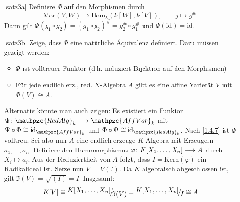 \documentclass[a4paper,12pt]{scrbook}
\makeatletter
\theoremstyle{blah}
\theoremstyle{stz}
\renewcommand{\proofname}{Beweis}
\renewenvironment{proof}[1][\proofname]{\par
  \pushQED{\qed}%
  \normalfont \topsep6\p@\@plus6\p@\relax
  \trivlist
  \item[\hskip\labelsep
        \itshape
    #1\@addpunct{:}]\ignorespaces
}{%
  \popQED\endtrivlist\@endpefalse
}
\def\I{\mathfrak{I}}
\newcommand{\AffVar}{\mathpzc{AffVar}}
\newcommand{\RedAlg}{\mathpzc{RedAlg}}
\newcommand{\Hom}{\mathrm{Hom}}
\newcommand{\Mor}{\mathrm{Mor}}
\newcommand{\Kern}{\mathrm{Kern}}
\newcommand{\id}{\mathrm{id}}
\newcommand{\ra}{\longrightarrow}
\renewcommand{\phi}{\varphi}
\renewcommand{\mapsto}{\longmapsto}
\newcommand{\Quotient}[2]{
  \raisebox{0.7ex}{\ensuremath{#1}}
  \ensuremath{\mkern-3mu}\big/\ensuremath{\mkern-3mu}
  \raisebox{-0.6ex}{\ensuremath{#2}}}
\newcommand{\polyx}[1][n]{\ensuremath%
  [X_{1},\dotsc,X_{#1}]}
\makeatother
\begin{document}
\begin{proof}
\begin{enumerate}
\item[\ref{satz3a}] Definiere $\Phi$ auf den Morphismen durch 
\[\Mor(V,W)\ra \Hom_k(k[W],k[V]), \qquad g\mapsto g^{\#}.\]
Dann gilt $\Phi(g_1\circ g_2)=(g_1\circ g_2)^{\#}=g_2^\#\circ g_1^\#$ und $\Phi(\id)=\id$.
\item[\ref{satz3b}] Zeige, dass $\Phi$ eine natürliche Äquivalenz definiert. Dazu müssen gezeigt werden: 
\begin{itemize}
\item $\Phi$ ist volltreuer Funktor (d.h. induziert Bijektion auf den Morphismen)
\item Für jede endlich erz., red. $K$-Algebra $A$ gibt es eine affine Varietät $V$ mit $\Phi(V)\cong A$. 
\end{itemize}
Alternativ könnte man auch zeigen: Es existiert ein Funktor $\Psi\colon  \RedAlg_k\ra \AffVar_k$ mit $\Psi\circ \Phi\cong \id_{\AffVar_k}$ und $\Phi\circ \Psi\cong \id_{\RedAlg_k}$.
Nach \autoref{1.4.7} ist $\Phi$ volltreu. Sei also nun $A$ eine endlich erzeuge $K$-Algebra mit Erzeugern $a_1,\dotsc,a_n$.
Definiere den Homomorphismus $\phi\colon  K\polyx\ra A$ durch $X_i\mapsto a_i$. Aus der Reduziertheit von $A$ folgt, dass
$I=\Kern(\phi)$ ein Radikalideal ist. Setze nun $V=\ V(I)$. Da $K$ algebraisch abgeschlossen ist, gilt $\I(V)=\sqrt{(I)}=I$. Insgesamt:
\[K[V]\cong\Quotient{K\polyx}{\I(V)}=\Quotient{K\polyx}{I}\cong A\] 
\end{enumerate}
\end{proof}
\end{document}
